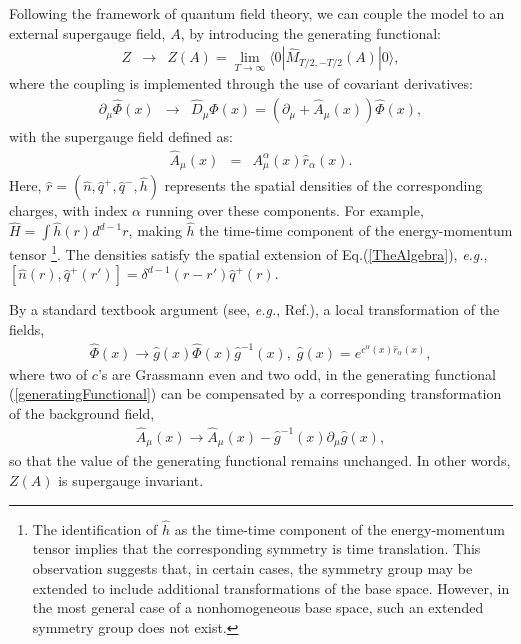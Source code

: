 \documentclass[final,5p,10pt,times,twocolumn,year]{elsarticle}
\begin{document}
Following the framework of quantum field theory, we can couple the model to an external supergauge field, $A$, \cite{QUILLEN198589} by introducing the generating functional:
\begin{eqnarray}
    Z &\to& Z(A) = \lim_{T\to\infty}\langle 0 | \hat M_{T/2, -T/2}(A)| 0 \rangle,\label{generatingFunctional}
\end{eqnarray}
where the coupling is implemented through the use of covariant derivatives:
\begin{eqnarray}
    \partial_\mu \hat \Phi(x) &\to& \hat D_\mu \hat \Phi(x) = (\partial_\mu + \hat{A}_\mu(x))\hat \Phi(x),
\end{eqnarray}
with the supergauge field defined as:
\begin{eqnarray}
    \hat{A}_\mu(x) &=& A_\mu^\alpha(x) \hat r_{\alpha}(x).
\end{eqnarray}
Here, $\hat r = (\hat n, \hat q^+, \hat q^-, \hat h)$ represents the spatial densities of the corresponding charges, with index $\alpha$ running over these components. For example, $\hat H = \int \hat h(r)d^{d-1}r$, making $\hat h$ the time-time component of the energy-momentum tensor \footnote{The identification of $\hat h$ as the time-time component of the energy-momentum tensor implies that the corresponding symmetry is time translation. This observation suggests that, in certain cases, the symmetry group may be extended to include additional transformations of the base space. However, in the most general case of a nonhomogeneous base space, such an extended symmetry group does not exist.}. The densities satisfy the spatial extension of Eq.(\ref{TheAlgebra}), \emph{e.g.}, $[\hat n(r), \hat q^+(r')] = \delta^{d-1}(r-r')\hat q^+(r)$.

By a standard textbook argument (see, \emph{e.g.}, Ref.\cite{Seinberg}), a local transformation of the fields,
\begin{eqnarray}
    \hat \Phi(x) \to \hat g(x) \hat \Phi(x) \hat g^{-1}(x), \;\hat g(x) = e^{c^{\alpha}(x) \hat r_{\alpha}(x)},
\end{eqnarray}
where two of $c$'s are Grassmann even and two odd, in the generating functional (\ref{generatingFunctional}) can be compensated by a corresponding transformation of the background field,
\begin{eqnarray}
    \hat{A}_\mu(x) \to \hat{A}_\mu(x) - \hat g^{-1}(x)\partial_\mu \hat g(x),
\end{eqnarray}
so that the value of the generating functional remains unchanged. In other words, $Z(A)$ is supergauge invariant.
\end{document}
